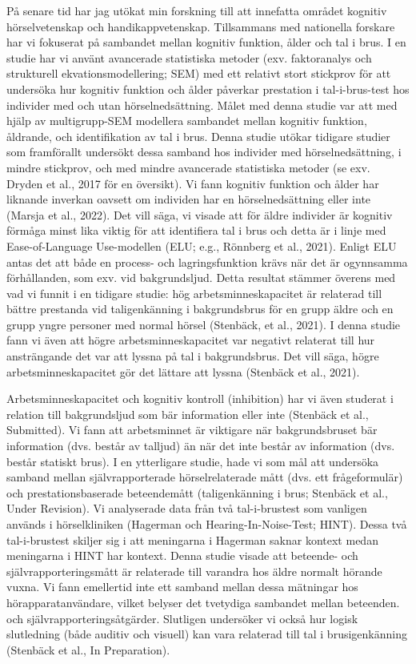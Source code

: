 \documentclass[]{article}
\begin{document}
På senare tid har jag utökat min forskning till att innefatta området
kognitiv hörselvetenskap och handikappvetenskap. Tillsammans med
nationella forskare har vi fokuserat på sambandet mellan kognitiv
funktion, ålder och tal i brus. I en studie har vi använt avancerade
statistiska metoder (exv. faktoranalys och strukturell
ekvationsmodellering; SEM) med ett relativt stort stickprov för att
undersöka hur kognitiv funktion och ålder påverkar prestation i
tal-i-brus-test hos individer med och utan hörselnedsättning. Målet med
denna studie var att med hjälp av multigrupp-SEM modellera sambandet
mellan kognitiv funktion, åldrande, och identifikation av tal i brus.
Denna studie utökar tidigare studier som framförallt undersökt dessa
samband hos individer med hörselnedsättning, i mindre stickprov, och med
mindre avancerade statistiska metoder (se exv. Dryden et al., 2017 för
en översikt). Vi fann kognitiv funktion och ålder har liknande inverkan
oavsett om individen har en hörselnedsättning eller inte (Marsja et al.,
2022). Det vill säga, vi visade att för äldre individer är kognitiv
förmåga minst lika viktig för att identifiera tal i brus och detta är i
linje med Ease-of-Language Use-modellen (ELU; e.g., Rönnberg et al.,
2021). Enligt ELU antas det att både en process- och lagringsfunktion
krävs när det är ogynnsamma förhållanden, som exv. vid bakgrundsljud.
Detta resultat stämmer överens med vad vi funnit i en tidigare studie:
hög arbetsminneskapacitet är relaterad till bättre prestanda vid
taligenkänning i bakgrundsbrus för en grupp äldre och en grupp yngre
personer med normal hörsel (Stenbäck, et al., 2021). I denna studie fann
vi även att högre arbetsminneskapacitet var negativt relaterat till hur
ansträngande det var att lyssna på tal i bakgrundsbrus. Det vill säga,
högre arbetsminneskapacitet gör det lättare att lyssna (Stenbäck et al.,
2021).

Arbetsminneskapacitet och kognitiv kontroll (inhibition) har vi även
studerat i relation till bakgrundsljud som bär information eller inte
(Stenbäck et al., Submitted). Vi fann att arbetsminnet är viktigare när
bakgrundsbruset bär information (dvs. består av talljud) än när det inte
består av information (dvs. består statiskt brus). I en ytterligare
studie, hade vi som mål att undersöka samband mellan självrapporterade
hörselrelaterade mått (dvs. ett frågeformulär) och prestationsbaserade
beteendemått (taligenkänning i brus; Stenbäck et al., Under Revision).
Vi analyserade data från två tal-i-brustest som vanligen används i
hörselkliniken (Hagerman och Hearing-In-Noise-Test; HINT). Dessa två
tal-i-brustest skiljer sig i att meningarna i Hagerman saknar kontext
medan meningarna i HINT har kontext. Denna studie visade att beteende-
och självrapporteringsmått är relaterade till varandra hos äldre normalt
hörande vuxna. Vi fann emellertid inte ett samband mellan dessa
mätningar hos hörapparatanvändare, vilket belyser det tvetydiga
sambandet mellan beteenden. och självrapporteringsåtgärder. Slutligen
undersöker vi också hur logisk slutledning (både auditiv och visuell)
kan vara relaterad till tal i brusigenkänning (Stenbäck et al., In
Preparation).
\end{document}
